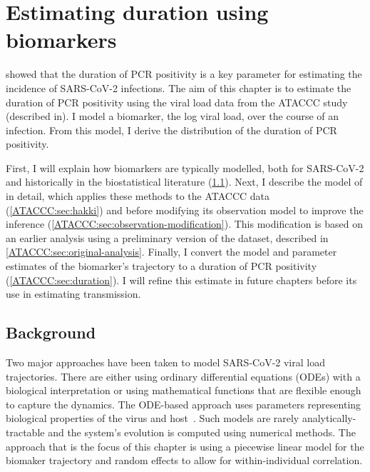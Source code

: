 \documentclass[thesis.tex]{subfiles}
\begin{document}
\ifSubfilesClassLoaded{
  \setcounter{chapter}{3}
}

\chapter{Estimating duration using biomarkers} \label{ATACCC}


 showed that the duration of PCR positivity is a key parameter for estimating the incidence of SARS-CoV-2 infections.
The aim of this chapter is to estimate the duration of PCR positivity using the viral load data from the ATACCC study (described in).
I model a biomarker, the log viral load, over the course of an infection.
From this model, I derive the distribution of the duration of PCR positivity.

First, I will explain how biomarkers are typically modelled, both for SARS-CoV-2 and historically in the biostatistical literature (\cref{ATACCC:sec:background}).
Next, I describe the model of \textcite{hakkiOnset} in detail, which applies these methods to the ATACCC data (\cref{ATACCC:sec:hakki}) and before modifying its observation model to improve the inference (\cref{ATACCC:sec:observation-modification}).
This modification is based on an earlier analysis using a preliminary version of the dataset, described in \cref{ATACCC:sec:original-analysis}.
Finally, I convert the model and parameter estimates of the biomarker's trajectory to a duration of PCR positivity (\cref{ATACCC:sec:duration}).
I will refine this estimate in future chapters before its use in estimating transmission.

\section{Background} \label{ATACCC:sec:background}

Two major approaches have been taken to model SARS-CoV-2 viral load trajectories.
There are either using ordinary differential equations (ODEs) with a biological interpretation or using mathematical functions that are flexible enough to capture the dynamics.
The ODE-based approach uses parameters representing biological properties of the virus and host~\autocites[e.g.:][]{ejimaEstimation,keVivo,kimQuantitative,goncalvesTiming,perelsonMechanistic}.
Such models are rarely analytically-tractable and the system's evolution is computed using numerical methods.
The approach that is the focus of this chapter is using a piecewise linear model for the biomaker trajectory and random effects to allow for within-individual correlation.
\end{document}
